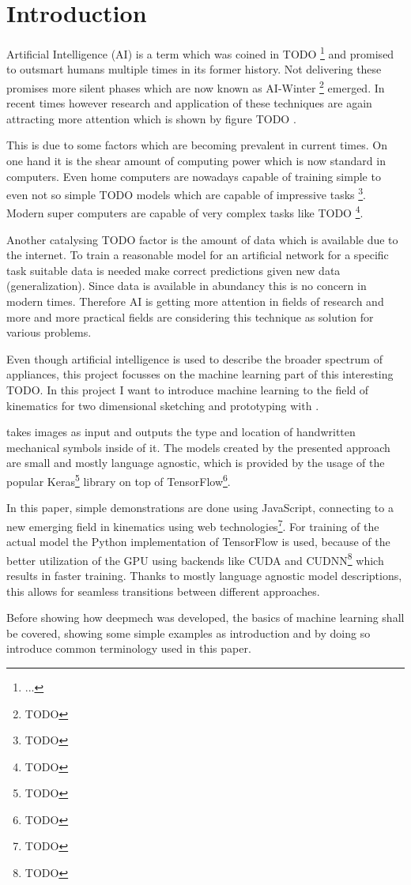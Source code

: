 \section{Introduction}

Artificial Intelligence (AI) is a term which was coined in TODO \footnote{ ... } and promised to
outsmart humans multiple times in its former history.
Not delivering these promises more silent phases which are now known as
AI-Winter \footnote { TODO } emerged.
In recent times however research and application of these techniques are again attracting more
attention which is shown by figure TODO .

This is due to some factors which are becoming prevalent in current times. On one hand it is the
shear amount of computing power which is now standard in computers. Even home computers are
nowadays capable of training simple to even not so simple TODO models which are capable of
impressive tasks \footnote { TODO }. Modern super computers are capable of very complex tasks like
TODO \footnote { TODO }.

Another catalysing TODO factor is the amount of data which is available due to the internet.
To train a reasonable model for an artificial network for a specific task suitable data is needed
make correct predictions given new data (generalization).
Since data is available in abundancy this is no concern in modern times.
Therefore AI is getting more attention in fields of research and more and more practical fields
are considering this technique as solution for various problems.

Even though artificial intelligence is used to describe the broader spectrum of appliances,
this project focusses on the machine learning part of this interesting TODO.
In this project I want to introduce machine learning to the field of kinematics for two
dimensional sketching and prototyping with .

 takes images as input and outputs the type and location of handwritten
mechanical symbols inside of it.
The models created by the presented approach are small and mostly language agnostic,
which is provided by the usage of the popular Keras\footnote{ TODO } library on top
of TensorFlow\footnote{ TODO }.

In this paper, simple demonstrations are done using JavaScript, connecting to a new emerging
field in kinematics using web technologies\footnote{ TODO }.
For training of the actual model the Python implementation of TensorFlow is used,
because of the better utilization of the GPU using backends like CUDA and CUDNN\footnote{ TODO }
which results in faster training. Thanks to mostly language agnostic model descriptions,
this allows for seamless transitions between different approaches.

Before showing how deepmech was developed, the basics of machine learning shall be covered,
showing some simple examples as introduction and by doing so introduce common terminology used in
this paper.
